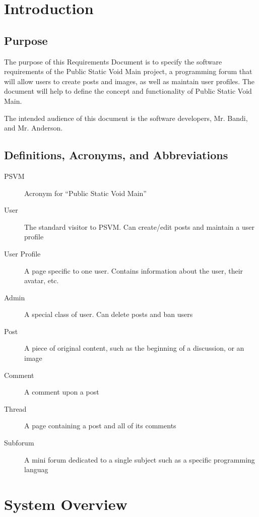 \documentclass[12pt]{scrartcl}
\begin{document}


\newpage\null\thispagestyle{empty}\newpage

\tableofcontents

\newpage\null\thispagestyle{empty}\newpage

\section{Introduction}
\subsection{Purpose}
The purpose of this Requirements Document is to specify the software requirements of the Public Static Void Main project, a programming forum that will allow users to create posts and images, as well as maintain user profiles. The document will help to define the concept and functionality of Public Static Void Main.
 
The intended audience of this document is the software developers, Mr. Bandi, and Mr. Anderson.
 
\subsection{Definitions, Acronyms, and Abbreviations}
\begin{description}
\item [PSVM]          	Acronym for “Public Static Void Main”
\item [User]            The standard visitor to PSVM. Can create/edit posts and maintain a user profile
\item [User Profile] 	A page specific to one user. Contains information about the user, their avatar, etc.
\item [Admin]         	A special class of user. Can delete posts and ban users
\item [Post]            A piece of original content, such as the beginning of a discussion, or an image
\item [Comment]			A comment upon a post
\item [Thread]			A page containing a post and all of its comments
\item [Subforum]  A mini forum dedicated to a single subject such as a specific programming languag
\end{description}
\section{System Overview}
\end{document}
